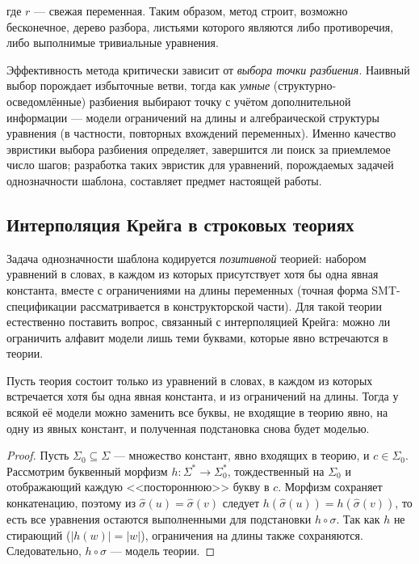 \documentclass[14pt, russian]{scrartcl}
\begin{document}
где $r$ --- свежая переменная. Таким образом, метод строит, возможно бесконечное, дерево
разбора, листьями которого являются либо противоречия, либо выполнимые тривиальные
уравнения.

Эффективность метода критически зависит от \textit{выбора точки разбиения}. Наивный
выбор порождает избыточные ветви, тогда как \textit{умные} (структурно-осведомлённые)
разбиения выбирают точку с учётом дополнительной информации --- модели ограничений на
длины и алгебраической структуры уравнения (в частности, повторных вхождений
переменных). Именно качество эвристики выбора разбиения определяет, завершится ли поиск
за приемлемое число шагов; разработка таких эвристик для уравнений, порождаемых задачей
однозначности шаблона, составляет предмет настоящей работы.

\subsection{Интерполяция Крейга в строковых теориях}
\label{sec:craig}

Задача однозначности шаблона кодируется \textit{позитивной} теорией: набором уравнений
в словах, в каждом из которых присутствует хотя бы одна явная константа, вместе с
ограничениями на длины переменных (точная форма SMT-спецификации рассматривается в
конструкторской части). Для такой теории естественно поставить вопрос, связанный с
интерполяцией Крейга: можно ли ограничить алфавит модели лишь теми буквами, которые
явно встречаются в теории.

\begin{Lemma}
\label{lem:craig}
Пусть теория состоит только из уравнений в словах, в каждом из которых встречается хотя
бы одна явная константа, и из ограничений на длины. Тогда у всякой её модели можно
заменить все буквы, не входящие в теорию явно, на одну из явных констант, и полученная
подстановка снова будет моделью.
\end{Lemma}

\begin{proof}
Пусть $\Sigma_0 \subseteq \Sigma$ --- множество констант, явно входящих в теорию,
и $c \in \Sigma_0$. Рассмотрим буквенный морфизм $h : \Sigma^* \to \Sigma_0^*$,
тождественный на $\Sigma_0$ и отображающий каждую <<постороннюю>> букву в $c$. Морфизм
сохраняет конкатенацию, поэтому из $\hat\sigma(u) = \hat\sigma(v)$ следует
$h(\hat\sigma(u)) = h(\hat\sigma(v))$, то есть все уравнения остаются выполненными для
подстановки $h \circ \sigma$. Так как $h$ не стирающий ($|h(w)| = |w|$), ограничения на
длины также сохраняются. Следовательно, $h \circ \sigma$ --- модель теории.
\end{proof}
\end{document}
